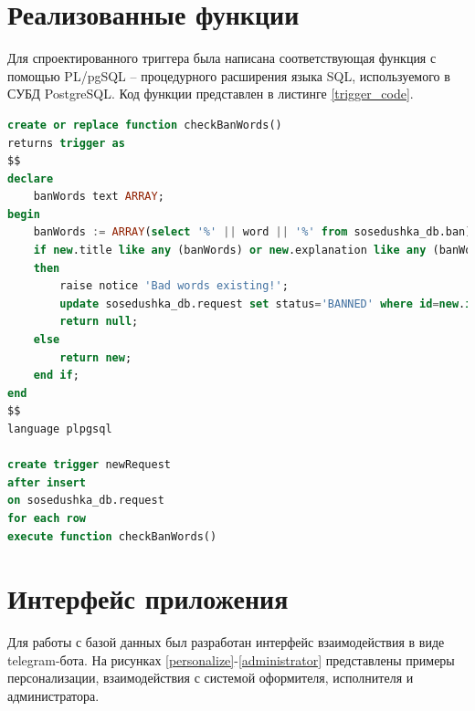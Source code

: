 \section{Реализованные функции}

Для спроектированного триггера была написана соответствующая функция с помощью PL/pgSQL \cite{plpgsql} -- процедурного расширения языка SQL, используемого в СУБД PostgreSQL. Код функции представлен в листинге \ref{trigger_code}.

\captionsetup{singlelinecheck = false, justification=raggedright}
\begin{lstlisting}[language=sql, caption=Реализация триггера AFTER на добавление заявки, label=trigger_code]
create or replace function checkBanWords()
returns trigger as 
$$
declare 
	banWords text ARRAY;
begin 
	banWords := ARRAY(select '%' || word || '%' from sosedushka_db.ban);
	if new.title like any (banWords) or new.explanation like any (banWords)
	then
		raise notice 'Bad words existing!';
		update sosedushka_db.request set status='BANNED' where id=new.id;
		return null;
	else
		return new;
	end if;
end
$$
language plpgsql

create trigger newRequest
after insert 
on sosedushka_db.request 
for each row 
execute function checkBanWords()
\end{lstlisting}
\captionsetup{singlelinecheck = false, justification=centering}

\section{Интерфейс приложения}

Для работы с базой данных был разработан интерфейс взаимодействия в виде telegram-бота. На рисунках \ref{personalize}-\ref{administrator} представлены примеры персонализации, взаимодействия с системой оформителя, исполнителя и администратора. 

